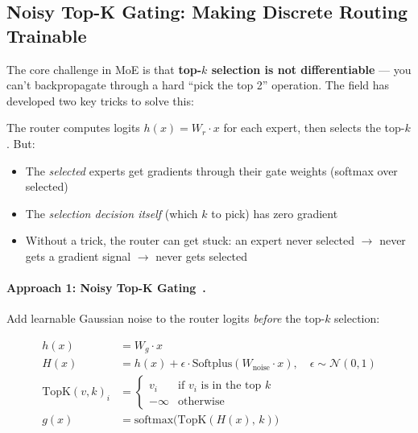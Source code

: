\subsection{Noisy Top-K Gating: Making Discrete Routing Trainable}
\label{noisy-top-k-gating-making-discrete-routing-trainable}

The core challenge in MoE is that \textbf{top-$k$ selection is not differentiable} --- you can’t backpropagate through a hard ``pick the top 2'' operation. The field has developed two key tricks to solve this:

\begin{intuitionbox}
The router computes logits $h(x) = W_r \cdot x$ for each expert, then selects the top-$k$. But:

\begin{itemize}
  \item The \emph{selected} experts get gradients through their gate weights (softmax over selected)
  \item The \emph{selection decision itself} (which $k$ to pick) has zero gradient
  \item Without a trick, the router can get stuck: an expert never selected $\rightarrow$ never gets a gradient signal $\rightarrow$ never gets selected
\end{itemize}
\end{intuitionbox}

\paragraph{Approach 1: Noisy Top-K Gating~\cite{shazeer2017outrageously}.}
\label{approach-1-noisy-top-k-gating-.}

Add learnable Gaussian noise to the router logits \emph{before} the top-$k$ selection:

\begin{align}
  h(x) &= W_g \cdot x \tag{clean logits} \\
  H(x) &= h(x) + \epsilon \cdot \text{Softplus}(W_{\text{noise}} \cdot x), \quad \epsilon \sim \mathcal{N}(0, 1) \tag{noisy logits} \\
  \text{TopK}(v, k)_i &= \begin{cases} v_i & \text{if } v_i \text{ is in the top } k \\ -\infty & \text{otherwise} \end{cases} \\
  g(x) &= \text{softmax}\big(\text{TopK}(H(x),\, k)\big) \tag{sparse gates}
\end{align}

